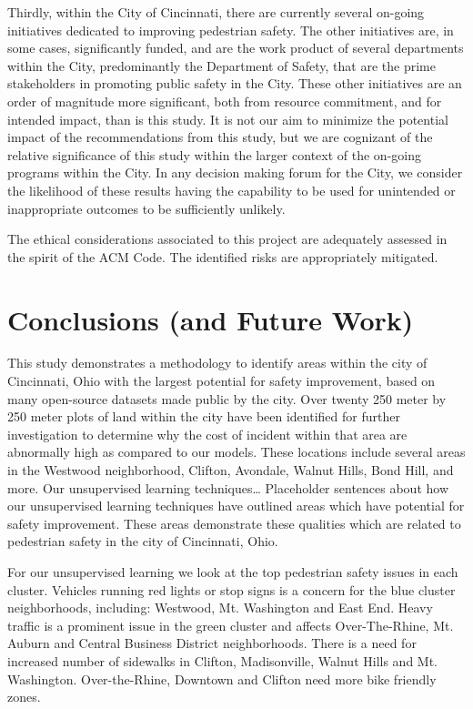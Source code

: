 \documentclass{llncs}
\begin{document}
Thirdly, within the City of Cincinnati, there are currently several on-going initiatives dedicated to improving pedestrian safety. The other initiatives are, in some cases, significantly funded, and are the work product of several departments within the City, predominantly the Department of Safety, that are the prime stakeholders in promoting public safety in the City. These other initiatives are an order of magnitude more significant, both from resource commitment, and for intended impact, than is this study. It is not our aim to minimize the potential impact of the recommendations from this study, but we are cognizant of the relative significance of this study within the larger context of the on-going programs within the City. In any decision making forum for the City, we consider the likelihood of these results having the capability to be used for unintended or inappropriate outcomes to be sufficiently unlikely.

The ethical considerations associated to this project are adequately assessed in the spirit of the ACM Code. The identified risks are appropriately mitigated.
%
\section{Conclusions (and Future Work)}
%

This study demonstrates a methodology to identify areas within the city of Cincinnati, Ohio with the largest potential for safety improvement, based on many open-source datasets made public by the city. Over twenty 250 meter by 250 meter plots of land within the city have been identified for further investigation to determine why the cost of incident within that area are abnormally high as compared to our models. These locations include several areas in the Westwood neighborhood, Clifton, Avondale, Walnut Hills, Bond Hill, and more. Our unsupervised learning techniques… Placeholder sentences about how our unsupervised learning techniques have outlined areas which have potential for safety improvement. These areas demonstrate these qualities which are related to pedestrian safety in the city of Cincinnati, Ohio.

For our unsupervised learning we look at the top pedestrian safety issues in each cluster. Vehicles running red lights or stop signs is a concern for the blue cluster neighborhoods, including: Westwood, Mt. Washington and East End. Heavy traffic is a prominent issue in the green cluster and affects Over-The-Rhine, Mt. Auburn and Central Business District neighborhoods. There is a need for increased number of sidewalks in Clifton, Madisonville, Walnut Hills and Mt. Washington. Over-the-Rhine, Downtown and Clifton need more bike friendly zones.
\end{document}
